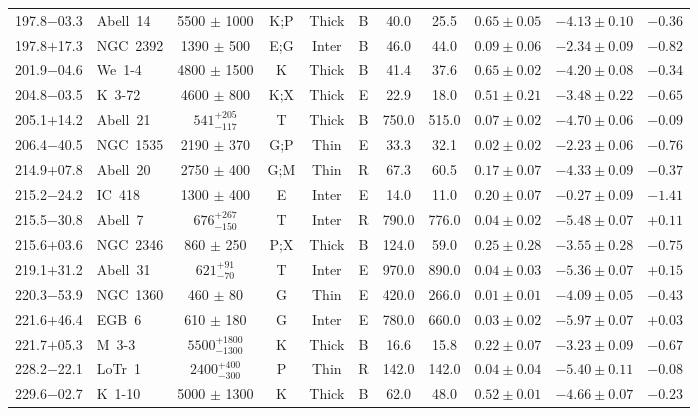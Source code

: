 \documentclass[useAMS]{mn2e}
\begin{document}
\begin{center}
{\begin{longtable}{llccccccccc}
197.8$-$03.3		&	Abell~14	&	5500	$\pm$	1000	&	K;P		&	Thick		&	B		&	40.0		&	25.5		&	$0.65 \pm 0.05$		&	$-4.13 \pm 0.10$		&	$-0.36$	\\
197.8$+$17.3		&	NGC~2392	&	1390	$\pm$	500	&	E;G		&	Inter		&	B		&	46.0		&	44.0		&	$0.09 \pm 0.06$		&	$-2.34 \pm 0.09$		&	$-0.82$	\\
201.9$-$04.6		&	We~1-4	&	4800	$\pm$	1500	&	K		&	Thick		&	B		&	41.4		&	37.6		&	$0.65 \pm 0.02$		&	$-4.20 \pm 0.08$		&	$-0.34$	\\
204.8$-$03.5		&	K~3-72	&	4600	$\pm$	800	&	K;X		&	Thick		&	E		&	22.9		&	18.0		&	$0.51 \pm 0.21$		&	$-3.48 \pm 0.22$		&	$-0.65$	\\
205.1$+$14.2		&	Abell~21	&	$541^{+205}_{-117}$		&	T		&	Thick		&	B		&	750.0		&	515.0		&	$0.07 \pm 0.02$		&	$-4.70 \pm 0.06$		&	$-0.09$	\\
206.4$-$40.5		&	NGC~1535	&	2190	$\pm$	370	&	G;P		&	Thin		&	E		&	33.3		&	32.1		&	$0.02 \pm 0.02$		&	$-2.23 \pm 0.06$		&	$-0.76$	\\
214.9$+$07.8		&	Abell~20	&	2750	$\pm$	400	&	G;M		&	Thin		&	R		&	67.3		&	60.5		&	$0.17 \pm 0.07$		&	$-4.33 \pm 0.09$		&	$-0.37$	\\
215.2$-$24.2		&	IC~418	&	1300	$\pm$	400	&	E		&	Inter		&	E		&	14.0		&	11.0		&	$0.20 \pm 0.07$		&	$-0.27 \pm 0.09$		&	$-1.41$	\\
215.5$-$30.8		&	Abell~7	&	$676^{+267}_{-150}$		&	T		&	Inter		&	R		&	790.0		&	776.0		&	$0.04 \pm 0.02$		&	$-5.48 \pm 0.07$		&	$+0.11$	\\
215.6$+$03.6		&	NGC~2346	&	860	$\pm$	250	&	P;X		&	Thick		&	B		&	124.0		&	59.0		&	$0.25 \pm 0.28$		&	$-3.55 \pm 0.28$		&	$-0.75$	\\
219.1$+$31.2		&	Abell~31	&	$621^{+91}_{-70}$		&	T		&	Inter		&	E		&	970.0		&	890.0		&	$0.04 \pm 0.03$		&	$-5.36 \pm 0.07$		&	$+0.15$	\\
220.3$-$53.9		&	NGC~1360	&	460	$\pm$	80	&	G		&	Thin		&	E		&	420.0		&	266.0		&	$0.01 \pm 0.01$		&	$-4.09 \pm 0.05$		&	$-0.43$	\\
221.6$+$46.4		&	EGB~6	&	610	$\pm$	180	&	G		&	Inter		&	E		&	780.0		&	660.0		&	$0.03 \pm 0.02$		&	$-5.97 \pm 0.07$		&	$+0.03$	\\
221.7$+$05.3		&	M~3-3	&	$5500^{+1800}_{-1300}$		&	K		&	Thick		&	B		&	16.6		&	15.8		&	$0.22 \pm 0.07$		&	$-3.23 \pm 0.09$		&	$-0.67$	\\
228.2$-$22.1		&	LoTr~1	&	$2400^{+400}_{-300}$		&	P		&	Thin		&	R		&	142.0		&	142.0		&	$0.04 \pm 0.04$		&	$-5.40 \pm 0.11$		&	$-0.08$	\\
229.6$-$02.7		&	K~1-10	&	5000	$\pm$	1300	&	K		&	Thick		&	B		&	62.0		&	48.0		&	$0.52 \pm 0.01$		&	$-4.66 \pm 0.07$		&	$-0.23$	\\

\end{longtable}}
\end{center}
\end{document}
